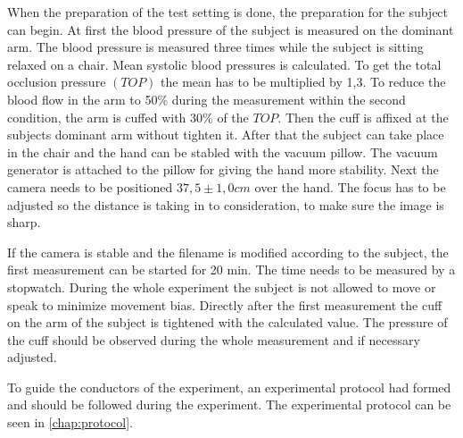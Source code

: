 When the preparation of the test setting is done, the preparation for the subject can begin. At first the blood pressure of the subject is measured on the dominant arm. The blood pressure is measured three times while the subject is sitting relaxed on a chair. Mean systolic blood pressures is calculated. To get the total occlusion pressure $(TOP)$ the mean has to be multiplied by 1,3. To reduce the blood flow in the arm to 50\% during the measurement within the second condition, the arm is cuffed with 30\% of the $TOP$.\cite{mouser2017} 
Then the cuff is affixed at the subjects dominant arm without tighten it. After that the subject can take place in the chair and the hand can be stabled with the vacuum pillow. The vacuum generator is attached to the pillow for giving the hand more stability. Next the camera needs to be positioned $37,5\pm 1,0 cm$ over the hand. The focus has to be adjusted so the distance is taking in to consideration, to make sure the image is sharp.

If the camera is stable and the filename is modified according to the subject, the first measurement can be started for 20 min. The time needs to be measured by a stopwatch. During the whole experiment the subject is not allowed to move or speak to minimize movement bias.
Directly after the first measurement the cuff on the arm of the subject is tightened with the calculated value. The pressure of the cuff should be observed during the whole measurement and if necessary adjusted.

To guide the conductors of the experiment, an experimental protocol had formed and should be followed during the experiment. The experimental protocol can be seen in \cref{chap:protocol}. 


